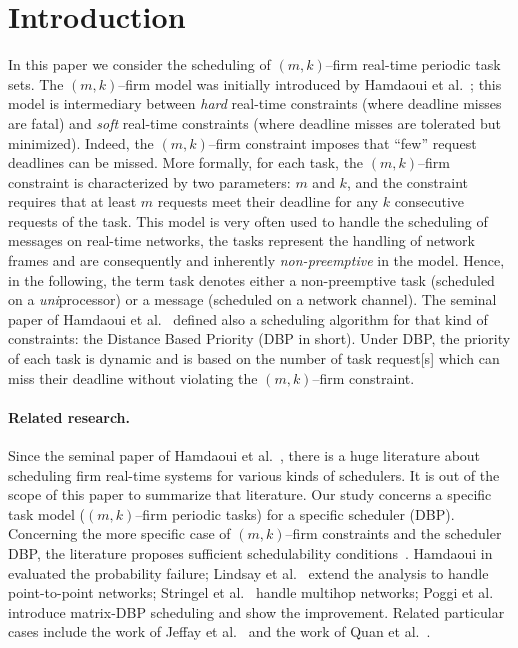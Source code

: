\documentclass{article}
\begin{document}
\section{Introduction}\label{intro} 
In this paper we consider the scheduling of $(m,k)$--firm real-time periodic task sets. The $(m,k)$--firm model was initially introduced by {Hamdaoui} et al.~\cite{Hamdaoui1995}; this model is intermediary between \emph{hard} real-time constraints (where deadline misses are fatal) and \emph{soft} real-time constraints (where deadline misses are tolerated but minimized). Indeed, the $(m,k)$--firm constraint imposes that ``few'' request deadlines can be missed. More formally, for each task, the $(m,k)$--firm constraint is characterized by two parameters: $m$ and $k$, and the constraint requires that at least $m$  requests meet their deadline for any $k$ consecutive requests of the task. This model is very often used to handle the scheduling of messages on real-time networks, the tasks represent the handling of network frames and are consequently and inherently \emph{non-preemptive} in the model. Hence, in the following, the term task denotes either a non-preemptive task (scheduled on a \emph{uni}processor) or a message (scheduled on a network channel). The seminal paper of {Hamdaoui} et al.~\cite{Hamdaoui1995} defined also a scheduling algorithm for that kind of constraints: the Distance Based Priority (DBP in short). Under DBP, the priority of each task is dynamic and is based on the number of task request[s] which can miss their deadline without violating the $(m,k)$--firm constraint. 

\paragraph{Related research.} 
Since the seminal paper of \mbox{Hamdaoui} et al.~\cite{Hamdaoui1995}, there is a huge literature about scheduling firm real-time systems for various kinds of schedulers. It is out of the scope of this paper to summarize that literature. Our study concerns a specific task model ($(m,k)$--firm periodic tasks) for a specific scheduler (DBP). Concerning the more specific case of $(m,k)$--firm constraints and the scheduler DBP, the literature proposes sufficient schedulability conditions~\cite{Li2004}. \mbox{Hamdaoui} in~\cite{Hamdaoui1997} evaluated the probability failure; \mbox{Lindsay} et al.~\cite{Lindsay1997} extend the analysis to handle point-to-point networks; \mbox{Stringel} et al.~\cite{Striegel2000} handle multihop networks; \mbox{Poggi} et al.~\cite{Poggi2003} introduce matrix-DBP scheduling and show the improvement. Related particular cases include the work of Jeffay et al.~\cite{Jeffay2005On-non-preempti} and the work of Quan et al.~\cite{Quan2000}.
\end{document}
